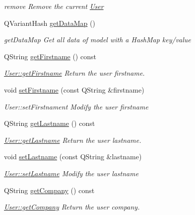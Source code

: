 \begin{DoxyCompactItemize}
\begin{DoxyCompactList}\small\item\em remove Remove the current \hyperlink{classModels_1_1User}{User} \end{DoxyCompactList}\item 
Q\-Variant\-Hash \hyperlink{classModels_1_1User_abbc8a3a40b527497872240bf39f21314}{get\-Data\-Map} ()
\begin{DoxyCompactList}\small\item\em get\-Data\-Map Get all data of model with a Hash\-Map key/value \end{DoxyCompactList}\item 
Q\-String \hyperlink{classModels_1_1User_a409a0a6becdd16b9a34120511526ab4d}{get\-Firstname} () const 
\begin{DoxyCompactList}\small\item\em \hyperlink{classModels_1_1User_a409a0a6becdd16b9a34120511526ab4d}{User\-::get\-Firstname} Return the user firstname. \end{DoxyCompactList}\item 
void \hyperlink{classModels_1_1User_a9fdff0463dc3653dd3c3bb7b60bf6c98}{set\-Firstname} (const Q\-String \&firstname)
\begin{DoxyCompactList}\small\item\em User\-::set\-Firstnament Modify the user {\itshape firstname} \end{DoxyCompactList}\item 
Q\-String \hyperlink{classModels_1_1User_acd71c39455f4289dac70fe3688b956a6}{get\-Lastname} () const 
\begin{DoxyCompactList}\small\item\em \hyperlink{classModels_1_1User_acd71c39455f4289dac70fe3688b956a6}{User\-::get\-Lastname} Return the user lastname. \end{DoxyCompactList}\item 
void \hyperlink{classModels_1_1User_a3537478a5fe9e2bcb74cd7e267ca1a5f}{set\-Lastname} (const Q\-String \&lastname)
\begin{DoxyCompactList}\small\item\em \hyperlink{classModels_1_1User_a3537478a5fe9e2bcb74cd7e267ca1a5f}{User\-::set\-Lastname} Modify the user {\itshape lastname} \end{DoxyCompactList}\item 
Q\-String \hyperlink{classModels_1_1User_a5c2a1436bfaaf39df26d1ff45196ff43}{get\-Company} () const 
\begin{DoxyCompactList}\small\item\em \hyperlink{classModels_1_1User_a5c2a1436bfaaf39df26d1ff45196ff43}{User\-::get\-Company} Return the user company. \end{DoxyCompactList}\item 

\end{DoxyCompactItemize}
